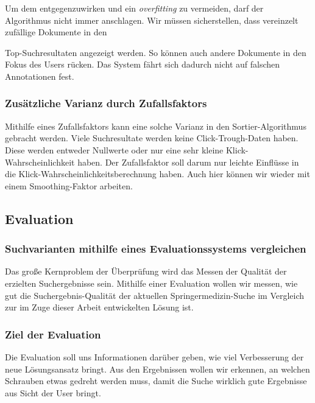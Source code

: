 Um dem entgegenzuwirken und ein \textit{overfitting} zu vermeiden, darf der Algorithmus nicht immer anschlagen. Wir müssen sicherstellen, dass vereinzelt zufällige Dokumente in den {\glqq Top-Suchresultaten\grqq{} angezeigt werden. So können auch andere Dokumente in den Fokus des Users rücken. Das System fährt sich dadurch nicht auf falschen Annotationen fest. 

\subsubsection{Zusätzliche Varianz durch Zufallsfaktors}
\label{sec:Einfuehrung:Methodik:Userrelevanz:Zufallsfaktors}

Mithilfe eines Zufallsfaktors kann eine solche Varianz in den Sortier-Algorithmus gebracht werden. Viele Suchresultate werden keine Click-Trough-Daten haben. Diese werden entweder Nullwerte oder nur eine sehr kleine Klick-Wahrscheinlichkeit haben. Der Zufallsfaktor soll darum nur leichte Einflüsse in die Klick-Wahrscheinlichkeitsberechnung haben. Auch hier können wir wieder mit einem Smoothing-Faktor arbeiten.

\subsection{Evaluation}
\label{sec:Einfuehrung:Methodik:Evaluation}

\subsubsection{Suchvarianten mithilfe eines Evaluationssystems vergleichen}
\label{sec:Einfuehrung:Methodik:Evaluation:Ziel}

Das große Kernproblem der Überprüfung wird das Messen der Qualität der erzielten Suchergebnisse sein. Mithilfe einer Evaluation wollen wir messen, wie gut die Suchergebnis-Qualität der aktuellen Springermedizin-Suche im Vergleich zur im Zuge dieser Arbeit entwickelten Lösung ist.

\subsubsection{Ziel der Evaluation}
\label{sec:Einfuehrung:Methodik:Evaluation:Ziel}

Die Evaluation soll uns Informationen darüber geben, wie viel Verbesserung der neue Lösungsansatz bringt. Aus den Ergebnissen wollen wir erkennen, an welchen \glqq Schrauben\grqq{} etwas gedreht werden muss, damit die Suche wirklich gute Ergebnisse aus Sicht der User bringt.

}
